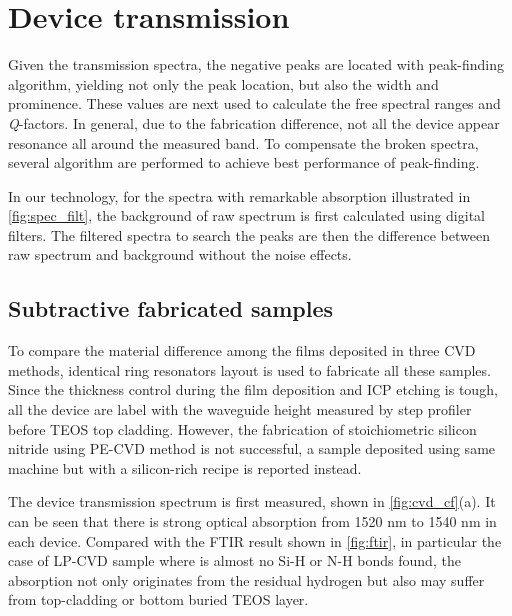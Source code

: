 \section{Device transmission}

Given the transmission spectra, the negative peaks are located with peak-finding algorithm, yielding not only the peak location, but also the width and prominence. These values are next used to calculate the free spectral ranges and \textit{Q}-factors. In general, due to the fabrication difference, not all the device appear resonance all around the measured band. To compensate the broken spectra, several algorithm are performed to achieve best performance of peak-finding. 

\begin{figure}
	\centering
	
	\mycaption{}{}
	\label{fig:spec_filt}
\end{figure}

In our technology, for the spectra with remarkable absorption illustrated in \autoref{fig:spec_filt}, the background of raw spectrum is first calculated using digital filters. The filtered spectra to search the peaks are then the difference between raw spectrum and background without the noise effects.


\subsection{Subtractive fabricated samples}

To compare the material difference among the films deposited in three CVD methods, identical ring resonators layout is used to fabricate all these samples. %
Since the thickness control during the film deposition and ICP etching is tough, all the device are label with the waveguide height measured by step profiler before TEOS top cladding. However, the fabrication of stoichiometric silicon nitride using PE-CVD method is not successful, a sample deposited using same machine but with a silicon-rich recipe is reported instead. 

The device transmission spectrum is first measured, shown in \autoref{fig:cvd_cf}(a). It can be seen that there is strong optical absorption from 1520 nm to 1540 nm in each device. Compared with the FTIR result shown in \autoref{fig:ftir}, in particular the case of LP-CVD sample where is almost no Si-H or N-H bonds found, the absorption not only originates from the residual hydrogen but also may suffer from top-cladding or bottom buried TEOS layer. 

